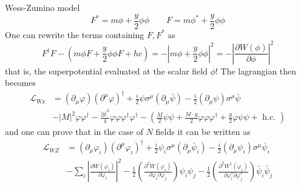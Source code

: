 \documentclass[10pt]{beamer}
\begin{document}
\begin{frame}{Wess-Zumino model}
    \begin{equation*}
        F^* = m\phi + \frac{y}{2}\phi\phi \qquad F = m \phi^* + \frac{y}{2} \phi \phi
    \end{equation*}
    One can rewrite the terms containing $F, F^*$ as  
    \begin{equation*}
        F^{\dagger} F-\left(m \phi F+\frac{y}{2} \phi \phi F+h c\right)=-\left|m \phi+\frac{y}{2} \phi \phi\right|^{2}=-\left|\frac{\partial W(\phi)}{\partial \phi}\right|^{2}
    \end{equation*}
    that is, the superpotential evaluated at the scalar field $\phi$!
    The lagrangian then becomes
    \begin{equation*}
        \begin{aligned}
            \mathcal{L}_{\mathrm{Wz}} &=\left(\partial_{\mu} \varphi\right)\left(\partial^{\mu} \varphi\right)^{\dagger}+\frac{i}{2} \psi \sigma^{\mu}\left(\partial_{\mu} \bar{\psi}\right)-\frac{i}{2}\left(\partial_{\mu} \psi\right) \sigma^{\mu} \bar{\psi} \\
            &-|M|^{2} \varphi \varphi^{\dagger}-\frac{|y|^{2}}{4} \varphi \varphi \varphi^{\dagger} \varphi^{\dagger}-\left(\frac{M}{2} \psi \psi+\frac{M \cdot y}{2} \varphi \varphi \varphi^{\dagger}+\frac{y}{2} \varphi \psi \psi+\text { h.c. }\right)
            \end{aligned}
    \end{equation*}
    and one can prove that in the case of $N$ fields it can be written as 
    \begin{equation*}
        \begin{aligned}
            \mathcal{L}_{W Z} &=\left(\partial_{\mu} \varphi_{i}\right)\left(\partial^{\mu} \varphi_{i}\right)^{\dagger}+\frac{i}{2} \psi_{i} \sigma^{\mu}\left(\partial_{\mu} \bar{\psi}_{i}\right)-\frac{i}{2}\left(\partial_{\mu} \psi_{i}\right) \sigma^{\mu} \bar{\psi}_{i} \\
            &-\sum_{i}\left|\frac{\partial W\left(\varphi_{i}\right)}{\partial \varphi_{i}}\right|^{2}-\frac{1}{2}\left(\frac{\partial^{2} W\left(\varphi_{i}\right)}{\partial \varphi_{i} \partial \varphi_{j}}\right) \psi_{i} \psi_{j}-\frac{1}{2}\left(\frac{\partial^{2} W^{\dagger}\left(\varphi_{i}\right)}{\partial \varphi_{i}^{*} \partial \varphi_{j}^{*}}\right) \bar{\psi}_{i} \bar{\psi}_{j}
            \end{aligned}
    \end{equation*}
\end{frame}
\end{document}
